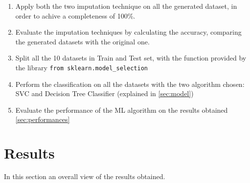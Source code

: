 \documentclass{article}
\begin{document}
\begin{enumerate}
    \item Apply both the two imputation technique on all the generated dataset, in order to achive a completeness of 100\%. 
    \item Evaluate the imputation techniques by calculating the accuracy, comparing the generated datasets with the original one.
    \item Split all the 10 datasets in Train and Test set, with the function provided by the library \texttt{from sklearn.model\_selection}
    \item Perform the classification on all the datasets with the two algorithm chosen: SVC and Decision Tree Classifier (explained in \ref{sec:model})
    \item Evaluate the performance of the ML algorithm on the results obtained \ref{sec:performances}
\end{enumerate}


\section{Results}
In this section an overall view of the results obtained.
\end{document}
